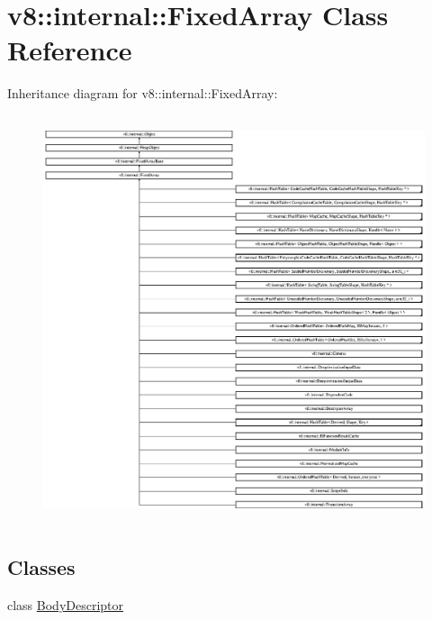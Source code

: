 \hypertarget{classv8_1_1internal_1_1_fixed_array}{}\section{v8\+:\+:internal\+:\+:Fixed\+Array Class Reference}
\label{classv8_1_1internal_1_1_fixed_array}
Inheritance diagram for v8\+:\+:internal\+:\+:Fixed\+Array\+:\begin{figure}[H]
\begin{center}
\leavevmode
\includegraphics[height=12.000000cm]{classv8_1_1internal_1_1_fixed_array}
\end{center}
\end{figure}
\subsection*{Classes}
\begin{DoxyCompactItemize}
\item 
class \hyperlink{classv8_1_1internal_1_1_fixed_array_1_1_body_descriptor}{Body\+Descriptor}
\end{DoxyCompactItemize}
